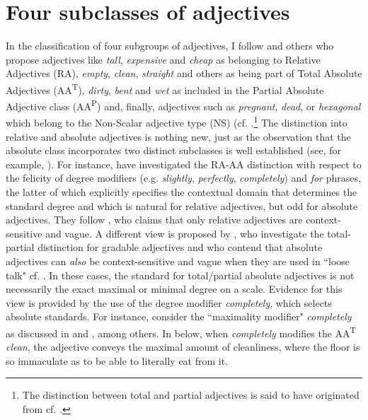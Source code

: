 \documentclass[output=paper]{langsci/langscibook}
\begin{document}
\section{Four subclasses of adjectives}\label{sec:four-adj}
In the classification of four subgroups of adjectives, I follow \citet{Burnett2017} and others who propose adjectives like \textit{tall}, \textit{expensive} and \textit{cheap} as belonging to Relative Adjectives (RA), \textit{empty}, \textit{clean}, \textit{straight} and others as being part of Total Absolute Adjectives (AA\textsuperscript{T}), \textit{dirty}, \textit{bent} and \textit{wet} as included in the Partial Absolute Adjective class (AA\textsuperscript{P}) and, finally, adjectives such as \textit{pregnant}, \textit{dead}, or \textit{hexagonal} which belong to the Non-Scalar adjective type (NS) (cf. \citealt[4]{Burnett2017}.\footnote{The distinction between total and partial adjectives is said to have originated from \citet{Yoon1996} cf. \textcite*[355]{Kennedy2005}.} The distinction into relative and absolute adjectives is nothing new, just as the observation that the absolute class incorporates two distinct subclasses is well established (see, for example, \citealt{Rotstein2004,Kennedy2005,Kennedy2007,Toledo2011}). For instance, \citet{Kennedy2005} have investigated the RA-AA distinction with respect to the felicity of degree modifiers (e.g. \textit{slightly},  \textit{perfectly},  \textit{completely}) and \textit{for} phrases, the latter of which explicitly specifies the contextual domain that determines the standard degree and which is natural for relative adjectives, but odd for absolute adjectives. They follow \citet{Unger:1975}, who claims that only relative adjectives are context-sensitive and vague.
A different view is proposed by \citet*{Rotstein2004}, who investigate the total-partial distinction for gradable adjectives and who contend that absolute adjectives can \textit{also} be context-sensitive and vague when they are used in ``loose talk" cf. \citet{Lewis1979}. In these cases, the standard for total/partial absolute adjectives is not necessarily the exact maximal or minimal degree on a scale. Evidence for this view is provided by the use of the degree modifier \textit{completely}, which selects absolute standards. For instance, consider the ``maximality modifier" \textit{completely} as discussed in \citet{Kennedy2005} and \cite*{Rotstein2004}, among others. In  below, when \textit{completely} modifies the AA\textsuperscript{T} \textit{clean}, the adjective conveys the maximal amount of cleanliness, where the floor is so immaculate as to be able to literally eat from it.
\end{document}
